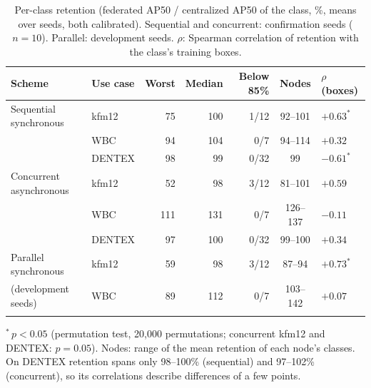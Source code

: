 \documentclass[pdflatex,sn-mathphys-num]{sn-jnl}
\begin{document}
\begin{table}[t]
\caption{Per-class retention (federated AP50 / centralized AP50 of the class, \%, means over seeds, both calibrated). Sequential and concurrent: confirmation seeds ($n=10$). Parallel: development seeds. $\rho$: Spearman correlation of retention with the class's training boxes.}\label{tab:fair}
\footnotesize
\begin{tabular*}{\textwidth}{@{\extracolsep\fill}llrrrcl}
\toprule
Scheme & Use case & Worst & Median & Below 85\% & Nodes & $\rho$ (boxes) \\
\midrule
Sequential synchronous & kfm12 & 75 & 100 & 1/12 & 92--101 & $+0.63^{*}$ \\
 & WBC & 94 & 104 & 0/7 & 94--114 & $+0.32$ \\
 & DENTEX & 98 & 99 & 0/32 & 99 & $-0.61^{*}$ \\
Concurrent asynchronous & kfm12 & 52 & 98 & 3/12 & 81--101 & $+0.59$ \\
 & WBC & 111 & 131 & 0/7 & 126--137 & $-0.11$ \\
 & DENTEX & 97 & 100 & 0/32 & 99--100 & $+0.34$ \\
Parallel synchronous & kfm12 & 59 & 98 & 3/12 & 87--94 & $+0.73^{*}$ \\
(development seeds) & WBC & 89 & 112 & 0/7 & 103--142 & $+0.07$ \\
\botrule
\end{tabular*}
\footnotesize{$^{*}\,p<0.05$ (permutation test, 20,000 permutations; concurrent kfm12 and DENTEX: $p=0.05$). Nodes: range of the mean retention of each node's classes. On DENTEX retention spans only 98--100\% (sequential) and 97--102\% (concurrent), so its correlations describe differences of a few points.}
\end{table}
\end{document}
